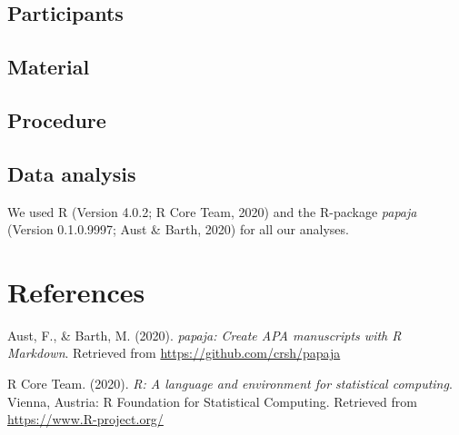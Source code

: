 \documentclass[
  english,
  man]{apa6}
\begin{document}
\hypertarget{participants}{%
\subsection{Participants}\label{participants}}

\hypertarget{material}{%
\subsection{Material}\label{material}}

\hypertarget{procedure}{%
\subsection{Procedure}\label{procedure}}

\hypertarget{data-analysis}{%
\subsection{Data analysis}\label{data-analysis}}

We used R (Version 4.0.2; R Core Team, 2020) and the R-package \emph{papaja} (Version 0.1.0.9997; Aust \& Barth, 2020) for all our analyses.

\newpage

\hypertarget{references}{%
\section{References}\label{references}}

\begingroup
\setlength{\parindent}{-0.5in}
\setlength{\leftskip}{0.5in}

\hypertarget{refs}{}
\leavevmode\hypertarget{ref-R-papaja}{}%
Aust, F., \& Barth, M. (2020). \emph{papaja: Create APA manuscripts with R Markdown}. Retrieved from \url{https://github.com/crsh/papaja}

\leavevmode\hypertarget{ref-R-base}{}%
R Core Team. (2020). \emph{R: A language and environment for statistical computing}. Vienna, Austria: R Foundation for Statistical Computing. Retrieved from \url{https://www.R-project.org/}

\endgroup
\end{document}
